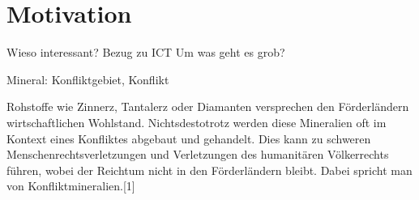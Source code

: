 \section{Motivation}\label{sec:motivation}

Wieso interessant?
Bezug zu ICT
Um was geht es grob?

Mineral: Konfliktgebiet, Konflikt

Rohstoffe wie Zinnerz, Tantalerz oder Diamanten versprechen den Förderländern wirtschaftlichen Wohlstand. Nichtsdestotrotz werden diese Mineralien oft im Kontext eines Konfliktes abgebaut und gehandelt. Dies kann zu schweren Menschenrechtsverletzungen und Verletzungen des humanitären Völkerrechts führen, wobei der Reichtum nicht in den Förderländern bleibt. Dabei spricht man von Konfliktmineralien.[1]
